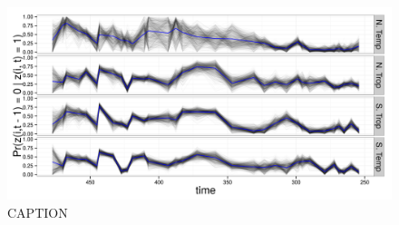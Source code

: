 \documentclass[12pt,letterpaper]{article}
\begin{document}
\begin{figure}[ht]
  \centering
  \includegraphics[width=\textwidth,height=0.5\textheight,keepaspectratio=true]{figure/turnover}
  \caption{CAPTION}
  \label{fig:turn}
\end{figure}

\end{document}
